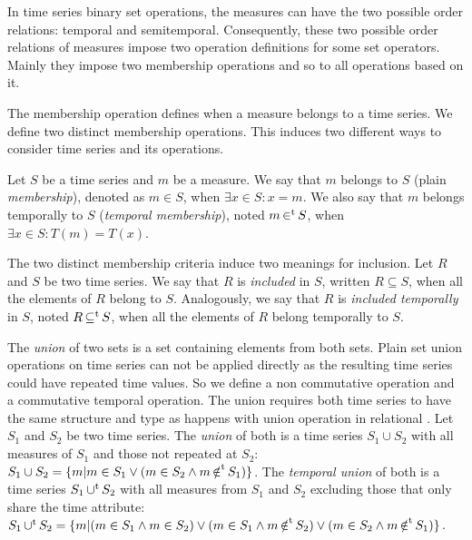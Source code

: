In time series binary set operations, the measures can have the two
possible order relations: temporal and semitemporal. Consequently,
these two possible order relations of measures impose two operation
definitions for some set operators.  Mainly they impose two membership
operations and so to all operations based on it.

The membership operation defines when a measure belongs to a time
series. We define two distinct membership operations. This induces two
different ways to consider time series and its operations.

%
Let $S$ be a time series and $m$ be a measure. 
%
We say that $m$ belongs to $S$ (plain \emph{membership}), denoted as
$m \in S$, when $\exists x\in S: x=m$.
%
We also say that $m$ belongs temporally to $S$ (\emph{temporal
  membership}), noted  $m \operatorname*{\in^t} S$, when $\exists x\in S :
T(m)=T(x)$.
%

The two distinct membership criteria induce two meanings for
inclusion. Let $R$ and $S$ be two time series. 
%
We say that $R$ is \emph{included} in $S$, written $R\subseteq S$,
when all the elements of $R$ belong to $S$.
%
Analogously, we say that $R$ is \emph{included temporally} in $S$,
noted $R\operatorname*{\subseteq^t} S$, when all the elements of $R$ belong temporally
to $S$.


The \emph{union} of two sets is a set containing elements from both
sets. Plain set union operations on time series can not be applied
directly as the resulting time series could have repeated time values.
So we define a non commutative operation and a commutative temporal
operation. The union requires both time series to have the same
structure and type as happens with union operation in relational
 \cite{date:introduction}. %
Let $S_1$ and $S_2$ be two time series. The \emph{union} of both is a
time series $S_1 \cup S_2$ with all measures of $S_1$ and those not
repeated at $S_2$: $S_1 \cup S_2 = \{ m | m\in S_1 \vee (m\in S_2
\wedge m \operatorname*{\notin^t} S_1) \}$. The \emph{temporal union} of both is a
time series $S_1 \operatorname*{\cup^t} S_2$ with all measures from $S_1$ and $S_2$
excluding those that only share the time attribute: $S_1 \operatorname*{\cup^t} S_2 =
\{ m | (m \in S_1 \wedge m \in S_2) \vee (m \in S_1 \wedge m \operatorname*{\notin^t}
S_2) \vee (m \in S_2 \wedge m \operatorname*{\notin^t} S_1) \}$.

